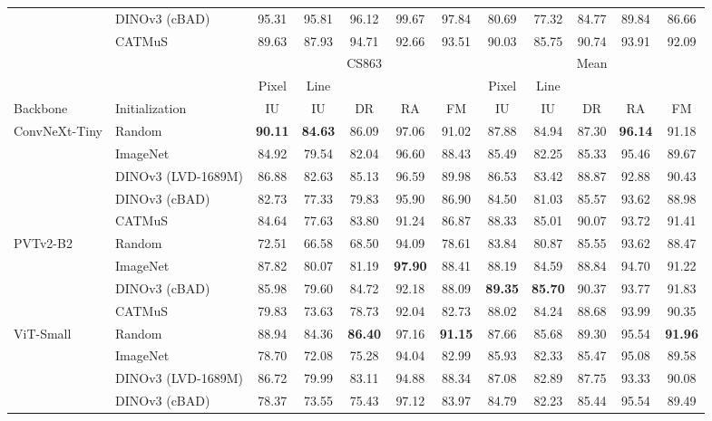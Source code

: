 \begin{table}[htbp]
\begin{tabular*}{\textwidth}{@{\extracolsep{\fill}}ll*{10}{c}@{}}
         & DINOv3 (cBAD) & 95.31 & 95.81 & 96.12 & 99.67 & 97.84 & 80.69 & 77.32 & 84.77 & 89.84 & 86.66 \\
         & CATMuS & 89.63 & 87.93 & 94.71 & 92.66 & 93.51 & 90.03 & 85.75 & 90.74 & 93.91 & 92.09 \\
        \midrule
        & & \multicolumn{5}{c}{CS863} & \multicolumn{5}{c}{Mean} \\
        \cmidrule(lr){3-7}\cmidrule(l){8-12}
        & & Pixel & Line & & & & Pixel & Line & & & \\
        Backbone & Initialization & IU & IU & DR & RA & FM & IU & IU & DR & RA & FM \\
        \midrule
        ConvNeXt-Tiny & Random & \textbf{90.11} & \textbf{84.63} & 86.09 & 97.06 & 91.02 & 87.88 & 84.94 & 87.30 & \textbf{96.14} & 91.18 \\
         & ImageNet & 84.92 & 79.54 & 82.04 & 96.60 & 88.43 & 85.49 & 82.25 & 85.33 & 95.46 & 89.67 \\
         & DINOv3 (LVD-1689M) & 86.88 & 82.63 & 85.13 & 96.59 & 89.98 & 86.53 & 83.42 & 88.87 & 92.88 & 90.43 \\
         & DINOv3 (cBAD) & 82.73 & 77.33 & 79.83 & 95.90 & 86.90 & 84.50 & 81.03 & 85.57 & 93.62 & 88.98 \\
         & CATMuS & 84.64 & 77.63 & 83.80 & 91.24 & 86.87 & 88.33 & 85.01 & 90.07 & 93.72 & 91.41 \\
        \addlinespace[1pt]
        PVTv2-B2 & Random & 72.51 & 66.58 & 68.50 & 94.09 & 78.61 & 83.84 & 80.87 & 85.55 & 93.62 & 88.47 \\
         & ImageNet & 87.82 & 80.07 & 81.19 & \textbf{97.90} & 88.41 & 88.19 & 84.59 & 88.84 & 94.70 & 91.22 \\
         & DINOv3 (cBAD) & 85.98 & 79.60 & 84.72 & 92.18 & 88.09 & \textbf{89.35} & \textbf{85.70} & 90.37 & 93.77 & 91.83 \\
         & CATMuS & 79.83 & 73.63 & 78.73 & 92.04 & 82.73 & 88.02 & 84.24 & 88.68 & 93.99 & 90.35 \\
        \addlinespace[1pt]
        ViT-Small & Random & 88.94 & 84.36 & \textbf{86.40} & 97.16 & \textbf{91.15} & 87.66 & 85.68 & 89.30 & 95.54 & \textbf{91.96} \\
         & ImageNet & 78.70 & 72.08 & 75.28 & 94.04 & 82.99 & 85.93 & 82.33 & 85.47 & 95.08 & 89.58 \\
         & DINOv3 (LVD-1689M) & 86.72 & 79.99 & 83.11 & 94.88 & 88.34 & 87.08 & 82.89 & 87.75 & 93.33 & 90.08 \\
         & DINOv3 (cBAD) & 78.37 & 73.55 & 75.43 & 97.12 & 83.97 & 84.79 & 82.23 & 85.44 & 95.54 & 89.49 \\

\end{tabular*}
\end{table}
